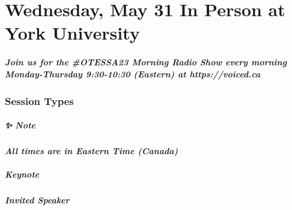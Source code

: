 \documentclass[
]{book}
\begin{document}
\hypertarget{wednesday-may-31-in-person-at-york-university}{%
\chapter{Wednesday, May 31 \textbar{} In Person at York University}\label{wednesday-may-31-in-person-at-york-university}}

\begin{protip}
\hypertarget{join-us-for-the-otessa23-morning-radio-show-every-morning-monday-thursday-930-1030-eastern-at-httpsvoiced.ca}{%
\paragraph{Join us for the \#OTESSA23 Morning Radio Show every morning
Monday-Thursday 9:30-10:30 (Eastern) at
https://voiced.ca}\label{join-us-for-the-otessa23-morning-radio-show-every-morning-monday-thursday-930-1030-eastern-at-httpsvoiced.ca}}
\end{protip}

\hypertarget{session-types-3}{%
\subsection*{Session Types}\label{session-types-3}}

\begin{protip}
\hypertarget{note}{%
\paragraph*{✨ Note}\label{note}}

\textbf{\emph{All times are in Eastern Time (Canada)}}
\end{protip}

\begin{keynote}
\hypertarget{keynote}{%
\paragraph{Keynote}\label{keynote}}
\end{keynote}

\begin{speaker}
\hypertarget{invited-speaker}{%
\paragraph{Invited Speaker}\label{invited-speaker}}
\end{speaker}
\end{document}
